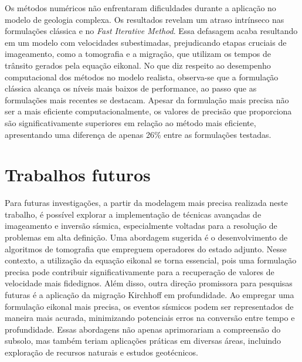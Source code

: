 Os métodos numéricos não enfrentaram dificuldades durante a aplicação no modelo de geologia complexa. Os resultados revelam um atraso intrínseco nas formulações clássica e no \textit{Fast Iterative Method}. Essa defasagem acaba resultando em um modelo com velocidades subestimadas, prejudicando etapas cruciais de imageamento, como a tomografia e a migração, que utilizam os tempos de trânsito gerados pela equação eikonal. No que diz respeito ao desempenho computacional dos métodos no modelo realista, observa-se que a formulação clássica alcança os níveis mais baixos de performance, ao passo que as formulações mais recentes se destacam. Apesar da formulação mais precisa não ser a mais eficiente computacionalmente, os valores de precisão que proporciona são significativamente superiores em relação ao método mais eficiente, apresentando uma diferença de apenas 26\% entre as formulações testadas.

\section{Trabalhos futuros}

Para futuras investigações, a partir da modelagem mais precisa realizada neste trabalho, é possível explorar a implementação de técnicas avançadas de imageamento e inversão sísmica, especialmente voltadas para a resolução de problemas em alta definição. Uma abordagem sugerida é o desenvolvimento de algoritmos de tomografia que empreguem operadores do estado adjunto. Nesse contexto, a utilização da equação eikonal se torna essencial, pois uma formulação precisa pode contribuir significativamente para a recuperação de valores de velocidade mais fidedignos. Além disso, outra direção promissora para pesquisas futuras é a aplicação da migração Kirchhoff em profundidade. Ao empregar uma formulação eikonal mais precisa, os eventos sísmicos podem ser representados de maneira mais acurada, minimizando potenciais erros na conversão entre tempo e profundidade. Essas abordagens não apenas aprimorariam a compreensão do subsolo, mas também teriam aplicações práticas em diversas áreas, incluindo exploração de recursos naturais e estudos geotécnicos.
